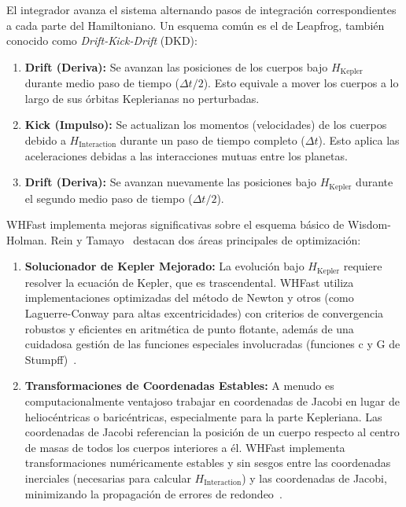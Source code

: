 El integrador avanza el sistema alternando pasos de integración correspondientes a cada parte del Hamiltoniano. Un esquema común es el de Leapfrog, también conocido como \textit{Drift-Kick-Drift} (DKD):
\begin{enumerate}
    \item \textbf{Drift (Deriva):} Se avanzan las posiciones de los cuerpos bajo \(H_{\text{Kepler}}\) durante medio paso de tiempo ($\Delta t/2$). Esto equivale a mover los cuerpos a lo largo de sus órbitas Keplerianas no perturbadas.
    \item \textbf{Kick (Impulso):} Se actualizan los momentos (velocidades) de los cuerpos debido a \(H_{\text{Interaction}}\) durante un paso de tiempo completo ($\Delta t$). Esto aplica las aceleraciones debidas a las interacciones mutuas entre los planetas.
    \item \textbf{Drift (Deriva):} Se avanzan nuevamente las posiciones bajo \(H_{\text{Kepler}}\) durante el segundo medio paso de tiempo ($\Delta t/2$).
\end{enumerate}

WHFast implementa mejoras significativas sobre el esquema básico de Wisdom-Holman. Rein y Tamayo~\cite{ReinTamayo2015} destacan dos áreas principales de optimización:
\begin{enumerate}
    \item \textbf{Solucionador de Kepler Mejorado:} La evolución bajo \(H_{\text{Kepler}}\) requiere resolver la ecuación de Kepler, que es trascendental. WHFast utiliza implementaciones optimizadas del método de Newton y otros (como Laguerre-Conway para altas excentricidades) con criterios de convergencia robustos y eficientes en aritmética de punto flotante, además de una cuidadosa gestión de las funciones especiales involucradas (funciones c y G de Stumpff)~\cite{ReinTamayo2015, Rein2012}.
    \item \textbf{Transformaciones de Coordenadas Estables:} A menudo es computacionalmente ventajoso trabajar en coordenadas de Jacobi en lugar de heliocéntricas o baricéntricas, especialmente para la parte Kepleriana. Las coordenadas de Jacobi referencian la posición de un cuerpo respecto al centro de masas de todos los cuerpos interiores a él. WHFast implementa transformaciones numéricamente estables y sin sesgos entre las coordenadas inerciales (necesarias para calcular \(H_{\text{Interaction}}\)) y las coordenadas de Jacobi, minimizando la propagación de errores de redondeo~\cite{ReinTamayo2015, Rein2012}.
\end{enumerate}

